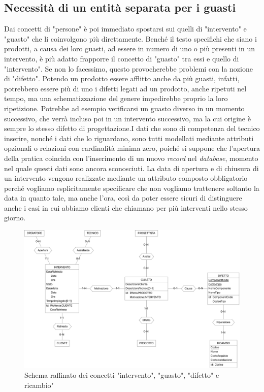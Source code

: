 \documentclass[a4paper, 12pt]{report}
\begin{document}
\newpage

\subsection{Necessità di un entità separata per i guasti}

Dai concetti di "persone" è poi immediato spostarsi sui quelli di "intervento" e "guasto" che li coinvolgono più direttamente. Benché il testo
specifichi che siano i prodotti, a causa dei loro guasti, ad essere in numero di uno o più presenti in un intervento, è più adatto frapporre il
concetto di "guasto" tra essi e quello di "intervento". Se non lo facessimo, questo provocherebbe problemi con la nozione di "difetto". Potendo
un prodotto essere afflitto anche da più guasti, infatti, potrebbero essere più di uno i difetti legati ad un prodotto, anche ripetuti nel tempo,
ma una schematizzazione del genere impedirebbe proprio la loro ripetizione. Potrebbe ad esempio verificarsi un guasto diverso in un momento successivo,
che verrà incluso poi in un intervento successivo, ma la cui origine è sempre lo stesso difetto di progettazione.\newline I dati che sono di competenza del tecnico
inserire, nonché i dati che lo riguardano, sono tutti modellati mediante attributi opzionali o relazioni con cardinalità minima zero, poiché si suppone che l'apertura della pratica coincida con 
l'inserimento di un nuovo \textit{record} nel \textit{database}, momento nel quale questi dati sono ancora sconosciuti.
La data di apertura e di chiusura di un intervento vengono realizzate mediante un attributo composto obbligatorio perché vogliamo esplicitamente specificare che non vogliamo
trattenere soltanto la data in quanto tale, ma anche l'ora, così da poter essere sicuri di distinguere anche i casi in cui abbiamo clienti che chiamano per più interventi nello
stesso giorno.

\begin{figure}[H]
	\centering
	\includegraphics[width=\linewidth]{images/interventi.png}
	\caption{Schema raffinato dei concetti "intervento", "guasto", "difetto" e ricambio"}
\end{figure}
\end{document}
